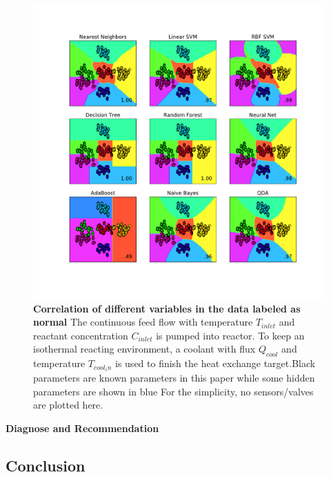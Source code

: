 \documentclass[fleqn,11pt]{wlscirep}
\begin{document}
\begin{figure}[h]
    \centering
    \includegraphics[width=12cm]{figure6.pdf}
    \caption{
    \textbf{Correlation of different variables in the data labeled as normal  } The continuous feed flow with temperature $T_{inlet}$ and reactant concentration $C_{inlet}$ is pumped into reactor. To keep an isothermal reacting environment, a coolant with flux $Q_{cool}$ and temperature $T_{cool_in} $ is used to finish the heat exchange target.Black parameters are known parameters in this paper while some hidden parameters  are shown in blue For the simplicity, no sensors/valves are plotted here.}
    \label{fig:1}
\end{figure}
\textbf{Diagnose and Recommendation }
 
\subsection*{Conclusion}


\end{document}
